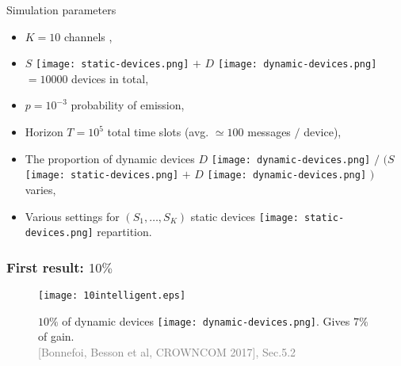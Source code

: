 \begin{frameO}

    \begin{colorblock}{Simulation parameters}

        \begin{itemize}
            \setlength\itemsep{10pt}
            \item
                  \(K = 10\) channels \slotmachine,
            \item
                  \(S\) \texttt{[image: static-devices.png]}
                  \(+\)
                  \(D\) \texttt{[image: dynamic-devices.png]}
                  \(= 10000\) devices
                  in total,
            \item
                  \(p = 10^{-3}\) probability of emission,
            \item
                  Horizon \(T = 10^5\) total time slots (avg. \(\simeq 100\) messages \(/\)
                  device),
            \item
                  The proportion of dynamic devices
                  \(D\)
                  \texttt{[image: dynamic-devices.png]}
                  \(/\)
                  \((S\)
                  \texttt{[image: static-devices.png]}
                  \(+\)
                  \(D\)
                  \texttt{[image: dynamic-devices.png]}
                  \()\)
                  varies,
            \item
                  Various settings for \((S_1,\dots,S_{K})\) static devices \texttt{[image: static-devices.png]} repartition.
        \end{itemize}

    \end{colorblock}

\end{frameO}



\subsubsection{First result: $10\%$}

\begin{frameO}

    \begin{figure}[h!]
        \centering
        \texttt{[image: 10intelligent.eps]}

            $10\%$ of dynamic devices \texttt{[image: dynamic-devices.png]}. Gives $7\%$ of gain.\\
            {\small \textcolor{gray}{[Bonnefoi, Besson et al, CROWNCOM 2017], Sec.5.2}}
    \end{figure}

\end{frameO}



